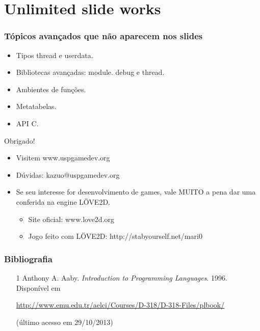 \documentclass[brazil]{beamer}
\begin{document}
\section{Unlimited slide works}
\begin{frame}
  \frametitle{Tópicos avançados que não aparecem nos slides}
  \begin{itemize}
    \item Tipos thread e userdata.
    \item Bibliotecas avançadas: module. debug e thread.
    \item Ambientes de funções.
    \item Metatabelas.
    \item API C.
  \end{itemize}
\end{frame}
\begin{frame}
  \begin{center}
    \LARGE Obrigado!
  \end{center}
  \begin{itemize}
    \item Visitem www.uspgamedev.org
    \item Dúvidas: kazuo@uspgamedev.org
    \item Se seu interesse for desenvolvimento de games,
          vale MUITO a pena dar uma conferida na engine
          LÖVE2D.
    \begin{itemize}
      \item Site oficial: www.love2d.org
      \item Jogo feito com LÖVE2D: http://stabyourself.net/mari0
    \end{itemize}
  \end{itemize}
\end{frame}
\begin{frame}
  \frametitle{Bibliografia}
  \begin{itemize}
    \footnotesize
    \item[1]
      Anthony A. Aaby. \textit{Introduction to Programming Languages}. 1996.
      Disponível em
      \begin{center}
        \scriptsize
        \url{http://www.emu.edu.tr/aelci/Courses/D-318/D-318-Files/plbook/}

        (último acesso em 29/10/2013)
      \end{center}
  \end{itemize}
\end{frame}
\end{document}
